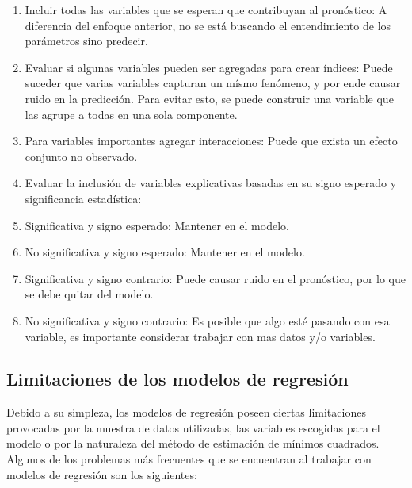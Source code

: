 \documentclass[
]{book}
\providecommand{\tightlist}{%
  \setlength{\itemsep}{0pt}\setlength{\parskip}{0pt}}
\begin{document}
\begin{enumerate}
\def\labelenumi{\arabic{enumi}.}
\tightlist
\item
  Incluir todas las variables que se esperan que contribuyan al
  pronóstico: A diferencia del enfoque anterior, no se está buscando
  el entendimiento de los parámetros sino predecir.
\item
  Evaluar si algunas variables pueden ser agregadas para crear
  índices: Puede suceder que varias variables capturan un mísmo
  fenómeno, y por ende causar ruido en la predicción. Para evitar
  esto, se puede construir una variable que las agrupe a todas en una
  sola componente.
\item
  Para variables importantes agregar interacciones: Puede que exista
  un efecto conjunto no observado.
\item
  Evaluar la inclusión de variables explicativas basadas en su signo
  esperado y significancia estadística:
\item
  Significativa y signo esperado: Mantener en el modelo.
\item
  No significativa y signo esperado: Mantener en el modelo.
\item
  Significativa y signo contrario: Puede causar ruido en el
  pronóstico, por lo que se debe quitar del modelo.
\item
  No significativa y signo contrario: Es posible que algo esté pasando
  con esa variable, es importante considerar trabajar con mas datos
  y/o variables.
\end{enumerate}

\subsection{Limitaciones de los modelos de regresión}\label{limitaciones-de-los-modelos-de-regresiuxf3n-1}

Debido a su simpleza, los modelos de regresión poseen ciertas
limitaciones provocadas por la muestra de datos utilizadas, las
variables escogidas para el modelo o por la naturaleza del método de
estimación de mínimos cuadrados. Algunos de los problemas más frecuentes
que se encuentran al trabajar con modelos de regresión son los
siguientes:
\end{document}
